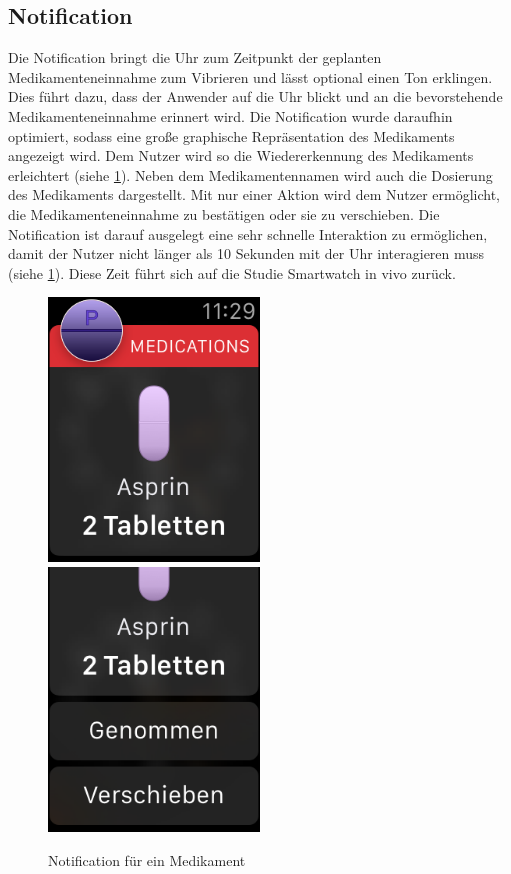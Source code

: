 \subsection{Notification}
 Die Notification bringt die Uhr zum Zeitpunkt der geplanten Medikamenteneinnahme zum Vibrieren und lässt optional einen Ton erklingen. Dies führt dazu, dass der Anwender auf die Uhr blickt und an die bevorstehende Medikamenteneinnahme erinnert wird. Die Notification wurde daraufhin optimiert, sodass eine große graphische Repräsentation des Medikaments angezeigt wird. Dem Nutzer wird so die Wiedererkennung des Medikaments erleichtert (siehe \ref{fig:watch-app-notification}). Neben dem Medikamentennamen wird auch die Dosierung des Medikaments dargestellt. Mit nur einer Aktion wird dem Nutzer ermöglicht, die Medikamenteneinnahme zu bestätigen oder sie zu verschieben. Die Notification ist darauf ausgelegt eine sehr schnelle Interaktion zu ermöglichen, damit der Nutzer nicht länger als 10 Sekunden mit der Uhr interagieren muss (siehe \ref{fig:watch-app-notification}). Diese Zeit führt sich auf die Studie \glqq Smartwatch in vivo\glqq \cite{Pizza:2016} zurück. 
\begin{figure}
	\caption{Notification für ein Medikament}
	\label{fig:watch-app-notification}
	\includegraphics[width=0.5\textwidth]{04_realisation/screenshots/watch/notification01.png}
	\includegraphics[width=0.5\textwidth]{04_realisation/screenshots/watch/notification02.png}
\end{figure}

